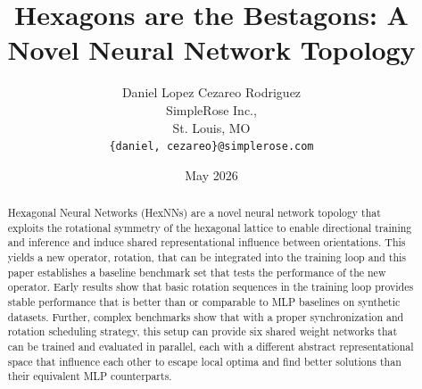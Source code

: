 \documentclass[twocolumn]{article}
\title{Hexagons are the Bestagons: A Novel Neural Network Topology}
\author{
Daniel Lopez \quad Cezareo Rodriguez\\
SimpleRose Inc.,\\
St. Louis, MO\\
\texttt{\{daniel, cezareo\}@simplerose.com}
}
\date{May 2026}
\begin{document}
\maketitle

\begin{abstract}
    Hexagonal Neural Networks (HexNNs) are a novel neural network topology that exploits the rotational symmetry of the hexagonal lattice to enable directional training and inference and induce shared representational influence between orientations.
    This yields a new operator, rotation, that can be integrated into the training loop and this paper establishes a baseline benchmark set that tests the performance of the new operator.
    Early results show that basic rotation sequences in the training loop provides stable performance that is better than or comparable to MLP baselines on synthetic datasets.
    Further, complex benchmarks show that with a proper synchronization and rotation scheduling strategy, this setup can provide six shared weight networks that can be trained and evaluated in parallel, each with a different abstract representational space that influence each other to escape local optima and find better solutions than their equivalent MLP counterparts.

\end{abstract}










\printbibliography
\end{document}
